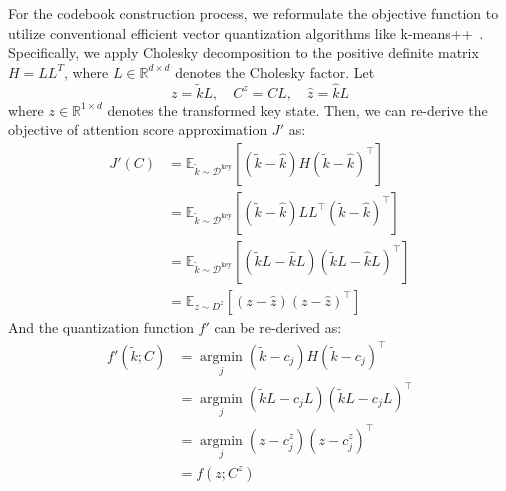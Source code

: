 For the codebook construction process, we reformulate the objective function to utilize conventional efficient vector quantization algorithms like k-means++~\citep{kmeans++}.
Specifically, we apply Cholesky decomposition to the positive definite matrix \(H = LL^T\), where \(L \in \mathbb R^{d \times d}\) denotes the Cholesky factor.
Let
\begin{equation}
    \label{eq:definition_z}
    z = \tilde k L, \quad C^z = CL, \quad\hat z = \hat k L
\end{equation}
where \(z \in \mathbb R^{1 \times d}\) denotes the transformed key state.
Then, we can re-derive the objective of attention score approximation \(J'\) as:
\begin{equation}
  \label{eq:objective_transform}
    \begin{aligned}
        J'(C) & = \mathbb E_{\tilde k \sim \mathcal {D^\mathrm{key}}} \left[(\tilde k - \hat k)H(\tilde k - \hat k)^\top\right] \\
        & = \mathbb E_{\tilde k \sim \mathcal {D^\mathrm{key}}} \left[(\tilde k - \hat k)LL^\top(\tilde k - \hat k)^\top\right] \\
        & = \mathbb E_{\tilde k \sim \mathcal {D^\mathrm{key}}} \left[(\tilde kL - \hat kL)(\tilde kL - \hat kL)^\top\right] \\
        & = \mathbb E_{z \sim D^z} \left[(z - \hat z)(z - \hat z)^\top\right]
    \end{aligned}
\end{equation}
And the quantization function \(f'\) can be re-derived as:
\begin{equation}
    \begin{aligned}
        f'(\tilde k; C) & = \operatorname*{argmin}_j (\tilde k - c_j) H (\tilde k - c_j)^\top     \\
        & = \operatorname*{argmin}_j (\tilde k L - c_jL)(\tilde k L - c_jL)^\top \\
        & = \operatorname*{argmin}_j (z - c^z_j)(z - c^z_j)^\top \\
        & = f(z; C^z)
    \end{aligned}
\end{equation}

